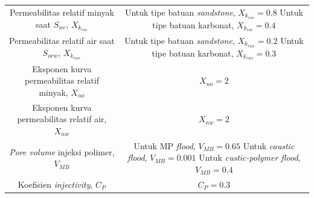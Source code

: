 \documentclass[
]{book}
\begin{document}
\begin{longtable}[]{@{}cc@{}}
\begin{minipage}[t]{0.47\columnwidth}
Permeabilitas relatif minyak saat \(S_{wc}\), \(X_{k_{roe}}\)\strut
\end{minipage} & \begin{minipage}[t]{0.47\columnwidth}\centering
Untuk tipe batuan \emph{sandstone}, \(X_{k_{roe}}=0.8\) Untuk tipe batuan karbonat, \(X_{k_{roe}}=0.4\)\strut
\end{minipage}\tabularnewline
\begin{minipage}[t]{0.47\columnwidth}\centering
Permeabilitas relatif air saat \(S_{orw}\), \(X_{k_{rwe}}\)\strut
\end{minipage} & \begin{minipage}[t]{0.47\columnwidth}\centering
Untuk tipe batuan \emph{sandstone}, \(X_{k_{rwe}}=0.2\) Untuk tipe batuan karbonat, \(X_{k_{rwe}}=0.3\)\strut
\end{minipage}\tabularnewline
\begin{minipage}[t]{0.47\columnwidth}\centering
Eksponen kurva permeabilitas relatif minyak, \(X_{no}\)\strut
\end{minipage} & \begin{minipage}[t]{0.47\columnwidth}\centering
\(X_{no}=2\)\strut
\end{minipage}\tabularnewline
\begin{minipage}[t]{0.47\columnwidth}\centering
Eksponen kurva permeabilitas relatif air, \(X_{nw}\)\strut
\end{minipage} & \begin{minipage}[t]{0.47\columnwidth}\centering
\(X_{nw}=2\)\strut
\end{minipage}\tabularnewline
\begin{minipage}[t]{0.47\columnwidth}\centering
\emph{Pore volume} injeksi polimer, \(V_{MB}\)\strut
\end{minipage} & \begin{minipage}[t]{0.47\columnwidth}\centering
Untuk MP \emph{flood}, \(V_{MB}=0.65\) Untuk \emph{caustic flood}, \(V_{MB}=0.001\) Untuk \emph{custic-polymer flood}, \(V_{MB}=0.4\)\strut
\end{minipage}\tabularnewline
\begin{minipage}[t]{0.47\columnwidth}\centering
Koefisien \emph{injectivity}, \(C_P\)\strut
\end{minipage} & \begin{minipage}[t]{0.47\columnwidth}\centering
\(C_P=0.3\)\strut
\end{minipage}\tabularnewline
\bottomrule
\end{longtable}
\end{document}
